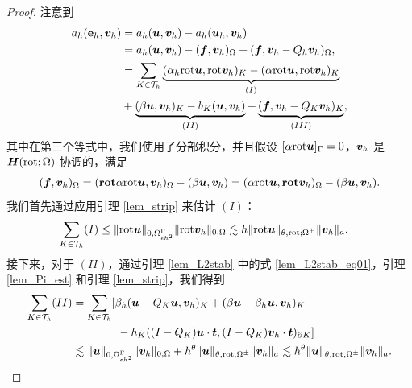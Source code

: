 \begin{proof}
注意到
\begin{equation}
\begin{split}
\label{lem_consist_eq1}
a_h(\mathbf{e}_h,\boldsymbol{v}_h) & = a_h(\boldsymbol{u},\boldsymbol{v}_h) - a_h(\boldsymbol{u}_h,\boldsymbol{v}_h)  \\
& = a_h(\boldsymbol{u},\boldsymbol{v}_h) - (\boldsymbol{f}, \boldsymbol{v}_h)_{\Omega} + (\boldsymbol{f}, \boldsymbol{v}_h - Q_h \boldsymbol{v}_h)_{\Omega}, \\
& =  \sum_{K\in\mathcal{T}_h}\underbrace{ (\alpha_h \mathrm{rot} \boldsymbol{u}, \mathrm{rot} \boldsymbol{v}_h)_{K} - ( \alpha \mathrm{rot} \boldsymbol{u}, \mathrm{rot} \boldsymbol{v}_h )_{K}}_{(I)} \\
& + \underbrace{ (\beta \boldsymbol{u}, \boldsymbol{v}_h)_{K} - b_K(\boldsymbol{u},\boldsymbol{v}_h) }_{(II)} + \underbrace{ (  \boldsymbol{f}, \boldsymbol{v}_h - Q_K \boldsymbol{v}_h )_K }_{(III)} ,
\end{split}
\end{equation}
其中在第三个等式中，我们使用了分部积分，并且假设 $[\alpha \mathrm{rot} \boldsymbol{u}]_{\Gamma} =
0$，$\boldsymbol{v}_h$ 是 $\boldsymbol{H}(\mathrm{rot};\Omega)$ 协调的，满足
\begin{equation}
\begin{split}
(\boldsymbol{f},\boldsymbol{v}_h)_{\Omega}  = ( \mathbf{rot} \alpha \mathrm{rot} \boldsymbol{u}, \boldsymbol{v}_h)_{\Omega} - (\beta \boldsymbol{u}, \boldsymbol{v}_h)
= (  \alpha \mathrm{rot} \boldsymbol{u}, \mathbf{rot} \boldsymbol{v}_h)_{\Omega}  - (\beta \boldsymbol{u}, \boldsymbol{v}_h).
\end{split}
\end{equation}
我们首先通过应用引理 \ref{lem_strip} 来估计 $(I)$：
\begin{equation}
\begin{split}
\label{lem_consist_eq2}
\sum_{K\in\mathcal{T}_h} (I) & \le \| \mathrm{rot} \boldsymbol{u} \|_{0,\Omega^{\Gamma}_{\epsilon h^2}} \| \mathrm{rot}\boldsymbol{v}_h \|_{0,\Omega} \lesssim h \| \mathrm{rot} \boldsymbol{u} \|_{\theta,\mathrm{rot};\Omega^{\pm}} \| \boldsymbol{v}_h \|_a.
\end{split}
\end{equation}
接下来，对于 $(II)$，通过引理 \ref{lem_L2stab} 中的式 \eqref{lem_L2stab_eq01}，引理 \ref{lem_Pi_est} 和引理 \ref{lem_strip}，我们得到
\begin{equation}
\begin{split}
\label{lem_consist_eq3}
\sum_{K\in\mathcal{T}_h}(II) & =  \sum_{K\in\mathcal{T}_h} [ \beta_h (\bu -   Q_K \bu ,  \bv_h)_{K} + ( \beta \bu -  \beta_h  \bu ,  \bv_h)_{K}  \\
& ~~~~~~~~~~~~ -  h_K ( (I - Q_K)\bu\cdot\bt , (I - Q_K)\bv_h\cdot\bt  )_{\partial K} ] \\
& \lesssim \| \bu \|_{0,\Omega^{\Gamma}_{\epsilon h^2}} \| \bv_h \|_{0,\Omega}  + h^{\theta} \| \bu \|_{\theta,\rot,\Omega^{\pm}} \| \bv_h \|_a  \lesssim h^{\theta} \| \bu \|_{\theta,\rot,\Omega^{\pm}} \| \bv_h \|_a  .

\end{split}
\end{equation}
\end{proof}
